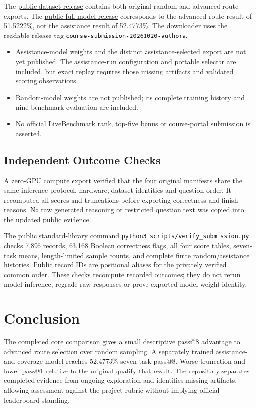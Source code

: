 \documentclass[10pt,letterpaper]{article}
\begin{document}
The \href{https://huggingface.co/datasets/rohitspider/reasoning-sft-submission-data-15k}{public dataset release} contains both original random and advanced route exports. The \href{https://huggingface.co/rohitspider/reasoning-sft-submission-full-15k}{public full-model release} corresponds to the advanced route result of 51.5222\%, not the assistance result of 52.4773\%. The downloader uses the readable release tag \texttt{course-submission-20261020-authors}.

\begin{itemize}
\item Assistance-model weights and the distinct assistance-selected export are not yet published. The assistance-run configuration and portable selector are included, but exact replay requires those missing artifacts and validated scoring observations.
\item Random-model weights are not published; its complete training history and nine-benchmark evaluation are included.
\item No official LiveBenchmark rank, top-five bonus or course-portal submission is asserted.
\end{itemize}

\subsection{Independent Outcome Checks}
A zero-GPU compute export verified that the four original manifests share the same inference protocol, hardware, dataset identities and question order. It recomputed all scores and truncations before exporting correctness and finish reasons. No raw generated reasoning or restricted question text was copied into the updated public evidence.

The public standard-library command \texttt{python3 scripts/verify\_submission.py} checks 7,896 records, 63,168 Boolean correctness flags, all four score tables, seven-task means, length-limited sample counts, and complete finite random/assistance histories. Public record IDs are positional aliases for the privately verified common order. These checks recompute recorded outcomes; they do not rerun model inference, regrade raw responses or prove exported model-weight identity.

\section{Conclusion}
The completed core comparison gives a small descriptive pass@8 advantage to advanced route selection over random sampling. A separately trained assistance-and-coverage model reaches 52.4773\% seven-task pass@8. Worse truncation and lower pass@1 relative to the original qualify that result. The repository separates completed evidence from ongoing exploration and identifies missing artifacts, allowing assessment against the project rubric without implying official leaderboard standing.
\end{document}
